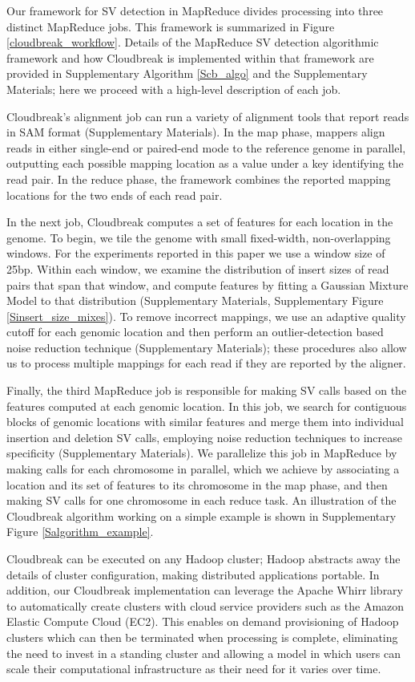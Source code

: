 \documentclass[11pt]{article}
\begin{document}
Our framework for SV detection in MapReduce divides processing into three distinct MapReduce jobs. This framework is summarized in Figure \ref{cloudbreak_workflow}. Details of the MapReduce SV detection algorithmic framework and how Cloudbreak is implemented within that framework are provided in Supplementary Algorithm \ref{Scb_algo} and the Supplementary Materials; here we proceed with a high-level description of each job.

Cloudbreak's alignment job can run a variety of alignment tools that report reads in SAM format (Supplementary Materials). In the map phase, mappers align reads in either single-end or paired-end mode to the reference genome in parallel, outputting each possible mapping location as a value under a key identifying the read pair. In the reduce phase, the framework combines the reported mapping locations for the two ends of each read pair. 

In the next job, Cloudbreak computes a set of features for each location in the genome. To begin, we tile the genome with small fixed-width, non-overlapping windows. For the experiments reported in this paper we use a window size of 25bp. Within each window, we examine the distribution of insert sizes of read pairs that span that window, and compute features by fitting a Gaussian Mixture Model to that distribution (Supplementary Materials, Supplementary Figure \ref{Sinsert_size_mixes}). To remove incorrect mappings, we use an adaptive quality cutoff for each genomic location and then perform an outlier-detection based noise reduction technique (Supplementary Materials); these procedures also allow us to process multiple mappings for each read if they are reported by the aligner.

Finally, the third MapReduce job is responsible for making SV calls based on the features computed at each genomic location. In this job, we search for contiguous blocks of genomic locations with similar features and merge them into individual insertion and deletion SV calls, employing noise reduction techniques to increase specificity (Supplementary Materials).  We parallelize this job in MapReduce by making calls for each chromosome in parallel, which we achieve by associating a location and its set of features to its chromosome in the map phase, and then making SV calls for one chromosome in each reduce task. An illustration of the Cloudbreak algorithm working on a simple example is shown in Supplementary Figure \ref{Salgorithm_example}.

Cloudbreak can be executed on any Hadoop cluster; Hadoop abstracts away the details of cluster configuration, making distributed applications portable. In addition, our Cloudbreak implementation can leverage the Apache Whirr library to automatically create clusters with cloud service providers such as the Amazon Elastic Compute Cloud (EC2). This enables on demand provisioning of Hadoop clusters which can then be terminated when processing is complete, eliminating the need to invest in a standing cluster and allowing a model in which users can scale their computational infrastructure as their need for it varies over time.
\end{document}

